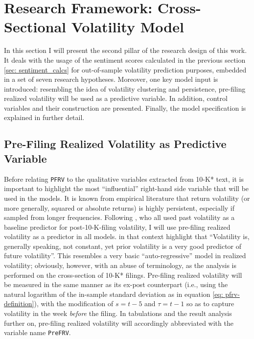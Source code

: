 \section{Research Framework: Cross-Sectional Volatility Model}
\label{sec: volamodel}

In this section I will present the second pillar of the research design of this work. It deals with the usage of the sentiment scores calculated in the previous section \ref{sec: sentiment_calcs} for out-of-sample volatility prediction purposes, embedded in a set of seven research hypotheses. Moreover, one key model input is introduced: resembling the idea of volatility clustering and persistence, pre-filing realized volatility will be used as a predictive variable. In addition, control variables and their construction are presented. Finally, the model specification is explained in further detail.


\subsection{Pre-Filing Realized Volatility as Predictive Variable}
\label{ssec: volamodel_timeseries}
Before relating \texttt{PFRV} to the qualitative variables extracted from 10-K* text, it is important to highlight the most \enquote{influential} right-hand side variable that will be used in the models. It is known from empirical literature that return volatility (or more generally, squared or absolute returns) is highly persistent, especially if sampled from longer frequencies. Following \textcite{Kogan2009_1, TsaiWang2016, Rekabsaz2017}, who all used past volatility as a baseline predictor for post-10-K-filing volatility, I will use pre-filing realized volatility as a predictor in all models. \textcite[275]{Kogan2009_1} in that context highlight that \enquote{Volatility is, generally speaking, not constant, yet prior volatility \textelp{} is a very good predictor of future volatility}. This resembles a very basic \enquote{auto-regressive} model in realized volatility; obviously, however, with an abuse of terminology, as the analysis is performed on the cross-section of 10-K* filings. Pre-filing realized volatility will be measured in the same manner as its ex-post counterpart (i.e., using the natural logarithm of the in-sample standard deviation as in equation \eqref{eq: pfrv-definition}), with the modification of $s = t-5$ and $\tau = t-1$ so as to capture volatility in the week \textit{before} the filing. In tabulations and the result analysis further on, pre-filing realized volatility will accordingly abbreviated with the variable name \texttt{PreFRV}. 


